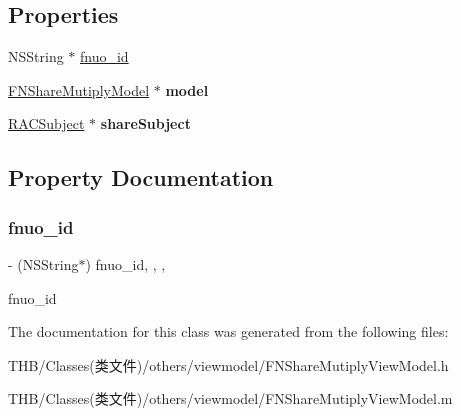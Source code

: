 \subsection*{Properties}
\begin{DoxyCompactItemize}
\item 
N\+S\+String $\ast$ \mbox{\hyperlink{interface_f_n_share_mutiply_view_model_a20ac7f6349aa813de05661d4aef9cd59}{fnuo\+\_\+id}}
\item 
\mbox{\label{interface_f_n_share_mutiply_view_model_aba165d0631d79b0dc50e5ed62059e93f}} 
\mbox{\hyperlink{interface_f_n_share_mutiply_model}{F\+N\+Share\+Mutiply\+Model}} $\ast$ {\bfseries model}
\item 
\mbox{\label{interface_f_n_share_mutiply_view_model_a8ad9be54240a9454d919ac2841d303e7}} 
\mbox{\hyperlink{interface_r_a_c_subject}{R\+A\+C\+Subject}} $\ast$ {\bfseries share\+Subject}
\end{DoxyCompactItemize}


\subsection{Property Documentation}
\mbox{\label{interface_f_n_share_mutiply_view_model_a20ac7f6349aa813de05661d4aef9cd59}} 
\subsubsection{\texorpdfstring{fnuo\+\_\+id}{fnuo\_id}}
{\footnotesize\ttfamily -\/ (N\+S\+String$\ast$) fnuo\+\_\+id\hspace{0.3cm}{\ttfamily [read]}, {\ttfamily [write]}, {\ttfamily [nonatomic]}, {\ttfamily [copy]}}

fnuo\+\_\+id 

The documentation for this class was generated from the following files\+:\begin{DoxyCompactItemize}
\item 
T\+H\+B/\+Classes(类文件)/others/viewmodel/F\+N\+Share\+Mutiply\+View\+Model.\+h\item 
T\+H\+B/\+Classes(类文件)/others/viewmodel/F\+N\+Share\+Mutiply\+View\+Model.\+m\end{DoxyCompactItemize}
